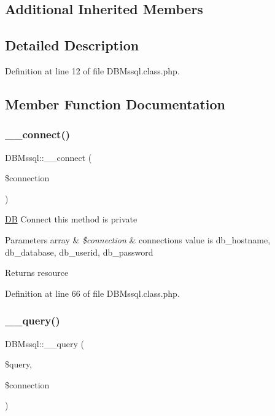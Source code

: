 \subsection*{Additional Inherited Members}


\subsection{Detailed Description}


Definition at line 12 of file D\+B\+Mssql.\+class.\+php.



\subsection{Member Function Documentation}
\mbox{\label{classDBMssql_a369f968ee79e1eb30e5d640c2294a7d1}} 
\subsubsection{\texorpdfstring{\+\_\+\+\_\+connect()}{\_\_connect()}}
{\footnotesize\ttfamily D\+B\+Mssql\+::\+\_\+\+\_\+connect (\begin{DoxyParamCaption}\item[{}]{\$connection }\end{DoxyParamCaption})}

\hyperlink{classDB}{DB} Connect this method is private 
\begin{DoxyParams}[1]{Parameters}
array & {\em \$connection} & connection\textquotesingle{}s value is db\+\_\+hostname, db\+\_\+database, db\+\_\+userid, db\+\_\+password \\
\hline
\end{DoxyParams}
\begin{DoxyReturn}{Returns}
resource 
\end{DoxyReturn}


Definition at line 66 of file D\+B\+Mssql.\+class.\+php.

\mbox{\label{classDBMssql_aa2d0d2f6680d70399f493b567d94ed92}} 
\subsubsection{\texorpdfstring{\+\_\+\+\_\+query()}{\_\_query()}}
{\footnotesize\ttfamily D\+B\+Mssql\+::\+\_\+\+\_\+query (\begin{DoxyParamCaption}\item[{}]{\$query,  }\item[{}]{\$connection }\end{DoxyParamCaption})}

